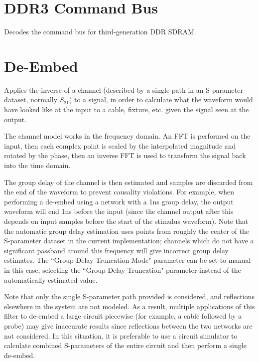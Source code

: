 \section{DDR3 Command Bus}

Decodes the command bus for third-generation DDR SDRAM.

\pagebreak
\section{De-Embed}
\label{filter:deembed}

Applies the inverse of a channel (described by a single path in an S-parameter dataset, normally $S_{21}$) to a signal,
in order to calculate what the waveform would have looked like at the input to a cable, fixture, etc. given the signal
seen at the output.

The channel model works in the frequency domain. An FFT is performed on the input, then each complex point is scaled by
the interpolated magnitude and rotated by the phase, then an inverse FFT is used to transform the signal back into the
time domain.

The group delay of the channel is then estimated and samples are discarded from the end of the waveform to prevent
causality violations. For example, when performing a de-embed using a network with a 1ns group delay, the output
waveform will end 1ns before the input (since the channel output after this depends on input samples before the start
of the stimulus waveform). Note that the automatic group delay estimation uses points from roughly the center of the
S-parameter dataset in the current implementation; channels which do not have a significant passband around this
frequency will give incorrect group delay estimates. The ``Group Delay Truncation Mode" parameter can be set to manual
in this case, selecting the ``Group Delay Truncation" parameter instead of the automatically estimated value.

Note that only the single S-parameter path provided is considered, and reflections elsewhere in the system are not
modeled. As a result, multiple applications of this filter to de-embed a large circuit piecewise (for example, a
cable followed by a probe) may give inaccurate results since reflections between the two networks are not considered.
In this situation, it is preferable to use a circuit simulator to calculate combined S-parameters of the entire circuit
and then perform a single de-embed.

